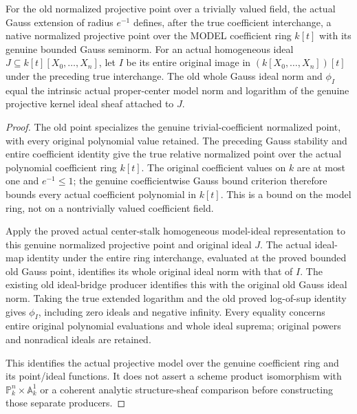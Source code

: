 \begin{theorem}
\label{projective:gauss-polynomial-model-ideal-log}
\leanok
{}
For the old normalized projective point over a trivially valued field,
the actual Gauss extension of radius $e^{-1}$ defines, after the true
coefficient interchange, a native normalized projective point over the
MODEL coefficient ring $k[t]$ with its genuine bounded Gauss seminorm.
For an actual homogeneous ideal $J\subseteq k[t][X_0,\ldots,X_n]$,
let $I$ be its entire original image in $(k[X_0,\ldots,X_n])[t]$ under
the preceding true interchange. The old whole Gauss ideal norm and
$\phi_I$ equal the intrinsic actual proper-center model norm and logarithm
of the genuine projective kernel ideal sheaf attached to $J$.
\end{theorem}
\begin{proof}
The old point specializes the genuine trivial-coefficient normalized
point, with every original polynomial value retained. The preceding
Gauss stability and entire coefficient identity give the true relative
normalized point over the actual polynomial coefficient ring $k[t]$.
The original coefficient values on $k$ are at most one and $e^{-1}\le1$;
the genuine coefficientwise Gauss bound criterion therefore bounds every
actual coefficient polynomial in $k[t]$. This is a bound on the model
ring, not on a nontrivially valued coefficient field.

Apply the proved actual center-stalk homogeneous model-ideal representation
to this genuine normalized projective point and original ideal $J$.
The actual ideal-map identity under the entire ring interchange, evaluated
at the proved bounded old Gauss point, identifies its whole original
ideal norm with that of $I$. The existing old ideal-bridge producer
identifies this with the original old Gauss ideal norm. Taking the true
extended logarithm and the old proved log-of-sup identity gives $\phi_I$,
including zero ideals and negative infinity. Every equality concerns
entire original polynomial evaluations and whole ideal suprema; original
powers and nonradical ideals are retained.

This identifies the actual projective model over the genuine coefficient
ring and its point/ideal functions. It does not assert a scheme product
isomorphism with $\mathbb P^n_k\times\mathbb A^1_k$ or a coherent analytic
structure-sheaf comparison before constructing those separate producers.
\end{proof}
